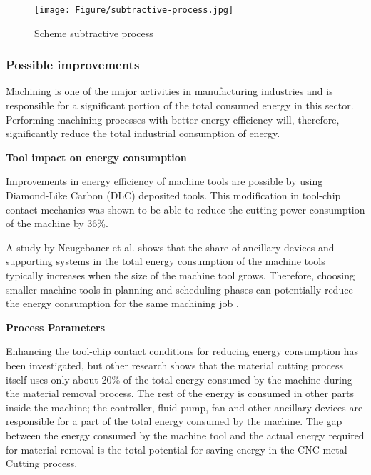 \begin{figure}[h!]
	\centering
	\texttt{[image: Figure/subtractive-process.jpg]}
	\caption{Scheme subtractive process}
	\label{fig:subtractiveprocess}
\end{figure}


\subsubsection{Possible improvements}

Machining is one of the major activities in manufacturing industries and is responsible for a significant portion of the total consumed energy in this sector. Performing machining processes with better energy efficiency will, therefore, significantly reduce the total industrial consumption of energy.

\textbf{Tool impact on energy consumption}

Improvements in energy efficiency of machine tools are possible by using Diamond-Like Carbon (DLC) deposited tools. This modification in tool-chip contact mechanics was shown to be able to reduce the cutting power consumption of the machine by 36\%.

A study by Neugebauer et al. shows that the share of ancillary devices and supporting systems in the total energy consumption of the machine tools typically increases when the size of the machine tool grows. Therefore, choosing smaller machine tools in planning and scheduling phases can potentially reduce the energy consumption for the same machining job \cite{Newman2012}.

\textbf{Process Parameters}

Enhancing the tool-chip contact conditions for reducing energy consumption has been investigated, but other research shows that the material cutting process itself uses only about 20\% of the total energy consumed by the machine during the material removal process. The rest of the energy is consumed in other parts inside the machine; the controller, fluid pump, fan and other ancillary devices are responsible for a part of the total energy consumed by the machine. The gap between the energy consumed by the machine tool and the actual energy required for material removal is the total potential for saving energy in the CNC metal Cutting process.

